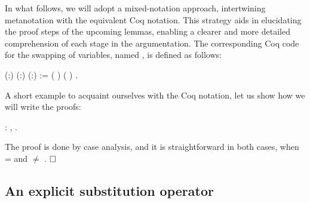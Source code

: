 In what follows, we will adopt a mixed-notation approach, intertwining metanotation with the equivalent Coq notation. This strategy aids in elucidating the proof steps of the upcoming lemmas, enabling a clearer and more detailed comprehension of each stage in the argumentation. The corresponding Coq code for the swapping of variables, named , is defined as follows: 
\begin{coqdoccode}
\coqdocemptyline
\coqdocnoindent
{}  (:) (:) (:) :=  ( \coqdocnotation{==} )     ( \coqdocnotation{==} )    .\coqdoceol
\coqdocemptyline
\end{coqdoccode}
A short example to acquaint ourselves with the Coq notation, let us show how we will write the proofs:
\begin{coqdoccode}
\coqdocemptyline
\coqdocnoindent
{} : \coqdockw{\ensuremath{\forall}}  ,      .\coqdoceol
\end{coqdoccode}
 The proof is done by case analysis, and it is straightforward in both cases, when  =  and  \ensuremath{\not=} . $\hfill\Box$ 
\begin{coqdoccode}
\coqdocemptyline
\end{coqdoccode}
\subsection{An explicit substitution operator}



